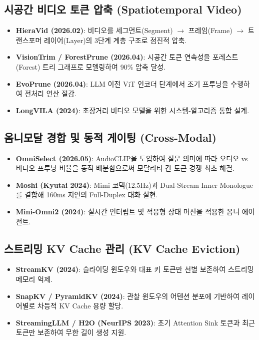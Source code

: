 \documentclass[10pt, a4paper, twocolumn]{article}
\begin{document}
\subsection{시공간 비디오 토큰 압축 (Spatiotemporal Video)}
\begin{itemize}
    \item \textbf{HieraVid (2026.02)}: 비디오를 세그먼트(Segment) $\rightarrow$ 프레임(Frame) $\rightarrow$ 트랜스포머 레이어(Layer)의 3단계 계층 구조로 점진적 압축.
    \item \textbf{VisionTrim / ForestPrune (2026.04)}: 시공간 토큰 연속성을 포레스트(Forest) 트리 그래프로 모델링하여 90\% 압축 달성.
    \item \textbf{EvoPrune (2026.04)}: LLM 이전 ViT 인코더 단계에서 조기 프루닝을 수행하여 전처리 연산 절감.
    \item \textbf{LongVILA (2024)}: 초장거리 비디오 모델을 위한 시스템-알고리즘 통합 설계.
\end{itemize}

\subsection{옴니모달 경합 및 동적 게이팅 (Cross-Modal)}
\begin{itemize}
    \item \textbf{OmniSelect (2026.05)}: AudioCLIP을 도입하여 질문 의미에 따라 오디오 vs 비디오 프루닝 비율을 동적 배분함으로써 모달리티 간 토큰 경쟁 최초 해결.
    \item \textbf{Moshi (Kyutai 2024)}: Mimi 코덱(12.5Hz)과 Dual-Stream Inner Monologue를 결합해 160ms 지연의 Full-Duplex 대화 실현.
    \item \textbf{Mini-Omni2 (2024)}: 실시간 인터럽트 및 적응형 상태 머신을 적용한 옴니 에이전트.
\end{itemize}

\subsection{스트리밍 KV Cache 관리 (KV Cache Eviction)}
\begin{itemize}
    \item \textbf{StreamKV (2024)}: 슬라이딩 윈도우와 대표 키 토큰만 선별 보존하여 스트리밍 메모리 억제.
    \item \textbf{SnapKV / PyramidKV (2024)}: 관찰 윈도우의 어텐션 분포에 기반하여 레이어별로 차등적 KV Cache 용량 할당.
    \item \textbf{StreamingLLM / H2O (NeurIPS 2023)}: 초기 Attention Sink 토큰과 최근 토큰만 보존하여 무한 길이 생성 지원.
\end{itemize}
\end{document}
